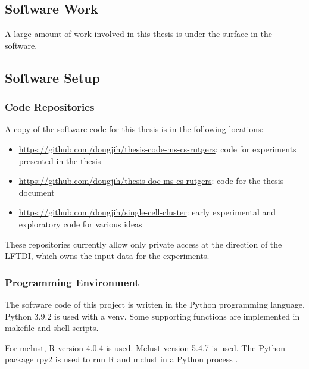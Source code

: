 \begin{theappendices}
\chapter{Software Work}
\thispagestyle{myheadings}
\label{appendix:Software Work}

A large amount of work involved in this thesis is under the surface in the software.

\section{Software Setup}

\FloatBarrier
\subsection{Code Repositories}

A copy of the software code for this thesis is in the following locations:

\begin{itemize}
  \item \url{https://github.com/dougjih/thesis-code-ms-cs-rutgers}: code for experiments presented in the thesis
  \item \url{https://github.com/dougjih/thesis-doc-ms-cs-rutgers}: code for the thesis document
  \item \url{https://github.com/dougjih/single-cell-cluster}: early experimental and exploratory code for various ideas
\end{itemize}

These repositories currently allow only private access at the direction of the LFTDI, which owns the input data for the experiments.

\FloatBarrier
\subsection{Programming Environment}

The software code of this project is written in the Python programming language. Python 3.9.2 is used with a venv. Some supporting functions are implemented in makefile and shell scripts.

For mclust, R version 4.0.4 is used. Mclust version 5.4.7 is used. The Python package rpy2 is used to run R and mclust in a Python process \cite{noauthor_rpy2_nodate}.


\end{theappendices}
